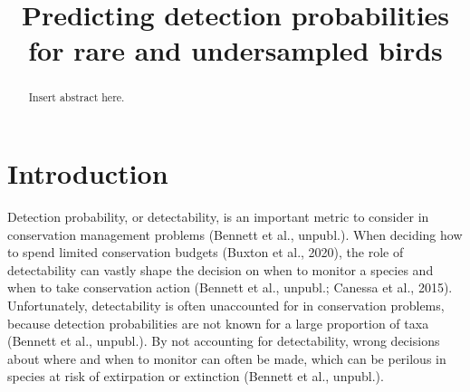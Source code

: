 \documentclass[]{article}
\title{Predicting detection probabilities for rare and undersampled birds}
\author{}
\begin{document}
\maketitle

\begin{abstract}
	
	Insert abstract here.

\end{abstract}

\section{Introduction}

Detection probability, or detectability, is an important metric to consider in conservation management problems (Bennett et al., unpubl.). When deciding how to spend limited conservation budgets (Buxton et al., 2020), the role of detectability can vastly shape the decision on when to monitor a species and when to take conservation action (Bennett et al., unpubl.; Canessa et al., 2015). Unfortunately, detectability is often unaccounted for in conservation problems, because detection probabilities are not known for a large proportion of taxa (Bennett et al., unpubl.). By not accounting for detectability, wrong decisions about where and when to monitor can often be made, which can be perilous in species at risk of extirpation or extinction (Bennett et al., unpubl.).
\end{document}
